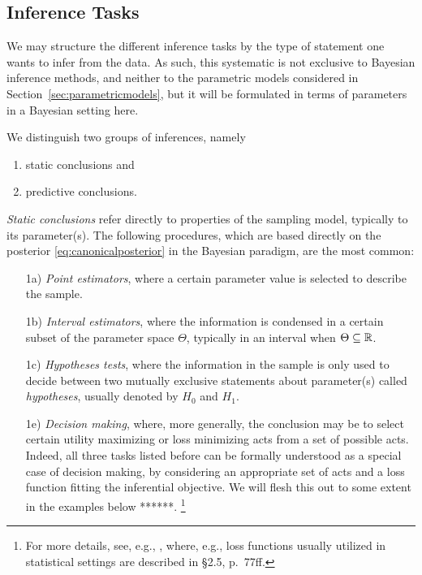 \subsection{Inference Tasks}
\label{sec:inferencetasks}

We may structure the different inference tasks by
the type of statement one wants to infer from the data.
As such, this systematic is not exclusive to Bayesian inference methods,
and neither to the parametric models considered in Section~\ref{sec:parametricmodels},
but it will be formulated in terms of parameters in a Bayesian setting here.

We distinguish two groups of inferences, namely
\begin{enumerate}
\item static conclusions and
\item predictive conclusions.%
\end{enumerate}

\emph{Static conclusions} refer directly to properties of the sampling model, typically to its parameter(s).
The following procedures, which are based directly on the posterior \eqref{eq:canonicalposterior} in the Bayesian paradigm,
are the most common:
\begin{enumerate}
\item[1a)] \emph{Point estimators},
where a certain parameter value is selected to describe the sample.
\item[1b)] \emph{Interval estimators},
where the information is condensed in a certain subset of the parameter space $\Theta$, typically in an interval when $\Theta \subseteq \mathbb{R}$.
\item[1c)] \emph{Hypotheses tests},
where the information in the sample is only used to decide between two mutually exclusive statements about parameter(s) called \emph{hypotheses},
usually denoted by $H_0$ and $H_1$.
\item[1e)] \emph{Decision making},
where, more generally, the conclusion may be to select certain utility maximizing or loss minimizing acts from a set of possible acts.
Indeed, all three tasks listed before can be formally understood as a special case of decision making,
by considering an appropriate set of acts and a loss function fitting the inferential objective.
We will flesh this out to some extent in the examples below ******.%
\footnote{For more details, see, e.g., \cite[\S 2]{2007:robert},
where, e.g., loss functions usually utilized in statistical settings are described in \S 2.5, p.~77ff.}
\end{enumerate}

